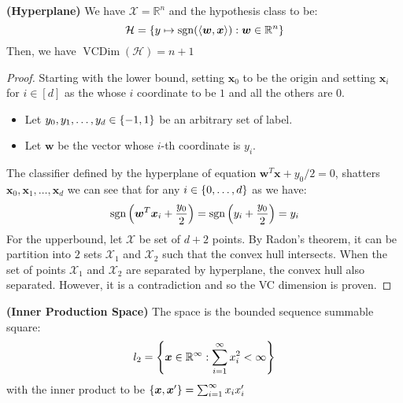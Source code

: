 \begin{proposition}{\textbf{(Hyperplane)}}
    We have $\mathcal{X} = \mathbb{R}^n$  and the hypothesis class to be:
    \begin{equation*}
        \mathcal{H} = \left\{ y \mapsto \operatorname{sgn}(\left\langle \boldsymbol w, \boldsymbol x \right\rangle) : \boldsymbol w \in \mathbb{R}^n \right\}
    \end{equation*}
    Then, we have $\operatorname{VCDim}(\mathcal{H}) = n+1$
\end{proposition}
\begin{proof}
    Starting with the lower bound, setting $\boldsymbol x_0$ to be the origin and setting $\boldsymbol x_i$ for $i\in[d]$ as the whose $i$ coordinate to be $1$ and all the others are $0$.
    \begin{itemize}
        \item Let $y_0, y_1,\dots,y_d \in \left\{ -1, 1 \right\}$ be an arbitrary set of label. 
        \item Let $\boldsymbol w$ be the vector whose $i$-th coordinate is $y_i$. 
    \end{itemize}
    The classifier defined by the hyperplane of equation $\boldsymbol w^T\boldsymbol x + y_0/2 = 0$, shatters $\boldsymbol x_0,\boldsymbol x_1, \dots,\boldsymbol x_d$ we can see that for any $i\in\left\{ 0, \dots,d \right\}$ as we have:
    \begin{equation*}
        \operatorname{sgn}\left( \boldsymbol w^T\boldsymbol x_i + \frac{y_0}{2} \right) = \operatorname{sgn}\left( y_i + \frac{y_0}{2} \right) = y_i
    \end{equation*}
    For the upperbound, let $\mathcal{X}$ be set of $d+2$ points. By Radon's theorem, it can be partition into $2$ sets $\mathcal{X}_1$ and $\mathcal{X}_2$ such that the convex hull intersects. When the set of points $\mathcal{X}_1$ and $\mathcal{X}_2$ are separated by hyperplane, the convex hull also separated. However, it is a contradiction and so the VC dimension is proven.
\end{proof}

\begin{definition}{\textbf{(Inner Production Space)}}
    The space is the bounded sequence summable square:
    \begin{equation*}
        l_2 = \left\{ \boldsymbol x \in \mathbb{R}^\infty : \sum^\infty_{i=1}x_i^2 < \infty \right\}
    \end{equation*} 
    with the inner product to be $\left\{ \boldsymbol x, \boldsymbol x' \right\} = \sum^\infty_{i=1}x_ix_i'$
\end{definition}

